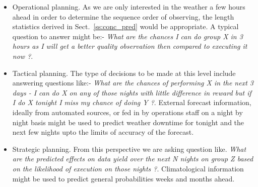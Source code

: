 {{\begin{itemize}
\item Operational planning. As we are only interested in the weather a few hours ahead in order to determine the sequence order of observing, the length statistics derived in Sect.~\ref{ss:conc_pred} would be appropriate. A typical question to answer might be:- \emph{What are the chances I can do group X in 3 hours as I will get a better quality observation then compared to executing it now ?}.

\item Tactical planning. The type of decisions to be made at this level include answering questions like:- \emph{What are the chances of performing X in the next 3 days - I can do X on any of those nights with little difference in reward but if I do X tonight I miss my chance of doing Y ?}. External forecast information, ideally from automated sources, or fed in by operations staff on a night by night basis might be used to predict weather downtime for tonight and the next few nights upto the limits of accuracy of the forecast.

\item Strategic planning. From this perspective we are asking question like. \emph{What are the predicted effects on data yield over the next N nights on group Z based on the likelihood of execution on those nights ?}. Climatological information might be used to predict general probabilities weeks and months ahead.

\end{itemize}


}}
